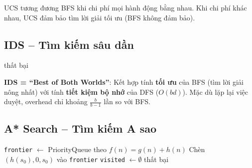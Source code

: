 \documentclass[a4paper,12pt]{article}
\begin{document}
UCS tương đương BFS khi chi phí mọi hành động bằng nhau. Khi chi phí khác nhau, UCS đảm bảo tìm lời giải tối ưu (BFS không đảm bảo).

\subsection{IDS -- Tìm kiếm sâu dần}

\begin{algorithm}[H]
\caption{IDS -- Iterative Deepening Search}
\label{alg:ids}
\Return thất bại\;
\BlankLine
{}
\end{algorithm}

\textbf{IDS = ``Best of Both Worlds''}: Kết hợp tính \textbf{tối ưu} của BFS (tìm lời giải nông nhất) với tính \textbf{tiết kiệm bộ nhớ} của DFS ($O(bd)$). Mặc dù lặp lại việc duyệt, overhead chỉ khoảng $\frac{b}{b-1}$ lần so với BFS.

\subsection{A* Search -- Tìm kiếm A sao}

\begin{algorithm}[H]
\caption{A* Search}
\label{alg:astar}
\texttt{frontier} $\leftarrow$ PriorityQueue theo $f(n) = g(n) + h(n)$\;
Chèn $(h(s_0), 0, s_0)$ vào \texttt{frontier}\;
\texttt{visited} $\leftarrow \emptyset$\;
\Return thất bại\;
\end{algorithm}
\end{document}
